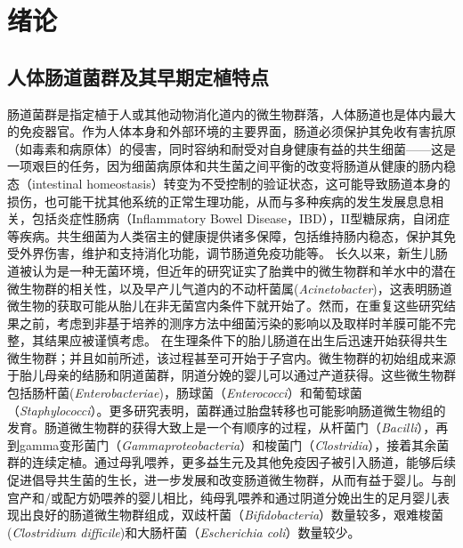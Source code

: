 
\chapter{绪论}
\label{chap:introduction}
\section{人体肠道菌群及其早期定植特点}
肠道菌群是指定植于人或其他动物消化道内的微生物群落，人体肠道也是体内最大的免疫器官。作为人体本身和外部环境的主要界面，肠道必须保护其免收有害抗原（如毒素和病原体）的侵害，同时容纳和耐受对自身健康有益的共生细菌——这是一项艰巨的任务，因为细菌病原体和共生菌之间平衡的改变将肠道从健康的肠内稳态（intestinal homeostasis）\cite{collier2005innate}转变为不受控制的验证状态，这可能导致肠道本身的损伤，也可能干扰其他系统的正常生理功能，从而与多种疾病的发生发展息息相关，包括炎症性肠病（Inflammatory Bowel Disease，IBD）\cite{ni2017gut}，II型糖尿病\cite{harsch2018role}，自闭症\cite{de2014altered, de2013fecal}等疾病。共生细菌为人类宿主的健康提供诸多保障，包括维持肠内稳态\cite{hooper2001commensal}，保护其免受外界伤害\cite{rakoff2004recognition}，维护和支持消化功能\cite{guarner2006mechanisms}，调节肠道免疫功能\cite{round2009gut,abreu2010toll}等。
长久以来，新生儿肠道被认为是一种无菌环境，但近年的研究证实了胎粪中的微生物群和羊水中的潜在微生物群的相关性\cite{ardissone2014meconium}，以及早产儿气道内的不动杆菌属(\textit{Acinetobacter})\cite{lohmann2014airway}，这表明肠道微生物的获取可能从胎儿在非无菌宫内条件下就开始了。然而，在重复这些研究结果之前，考虑到非基于培养的测序方法\cite{pennisi2014our}中细菌污染的影响以及取样时羊膜可能不完整，其结果应被谨慎考虑。
在生理条件下的胎儿肠道在出生后迅速开始获得共生微生物群；并且如前所述，该过程甚至可开始于子宫内。微生物群的初始组成来源于胎儿母亲的结肠和阴道菌群，阴道分娩的婴儿可以通过产道获得。这些微生物群包括肠杆菌(\textit{Enterobacteriae})，肠球菌（\textit{Enterococci}）和葡萄球菌（\textit{Staphylococci}）\cite{backhed2005host}。更多研究表明，菌群通过胎盘转移也可能影响肠道微生物组的发育\cite{aagaard2014placenta}。肠道微生物群的获得大致上是一个有顺序的过程，从杆菌门（\textit{Bacilli}），再到gamma变形菌门（\textit{Gammaproteobacteria}）和梭菌门（\textit{Clostridia}），接着其余菌群的连续定植\cite{la2014patterned}。通过母乳喂养，更多益生元及其他免疫因子被引入肠道，能够后续促进倡导共生菌的生长，进一步发展和改变肠道微生物群，从而有益于婴儿​​\cite{ouwehand2005prebiotics}。与剖宫产和/或配方奶喂养的婴儿相比，纯母乳喂养和通过阴道分娩出生的足月婴儿表现出良好的肠道微生物群组成，双歧杆菌（\textit{Bifidobacteria}）数量较多，艰难梭菌(\textit{Clostridium difficile})和大肠杆菌（\textit{Escherichia coli}）数量较少\cite{penders2006factors}。

